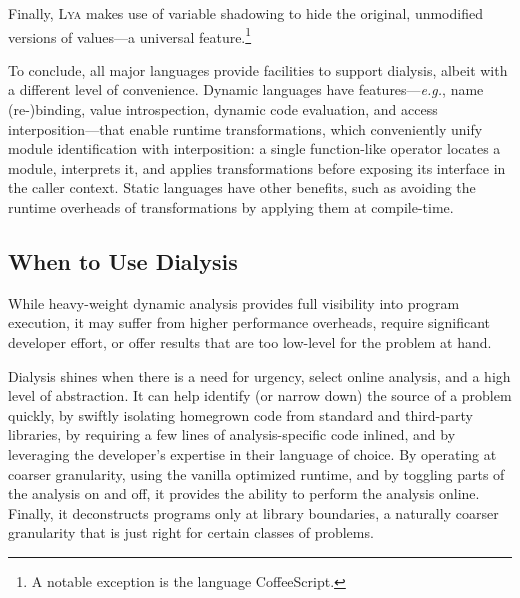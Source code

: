 \documentclass[letterpaper,twocolumn,10pt]{article}
\def\eg{{\em e.g.}, }
\def\ie{{\em i.e.}, }
\newcommand{\sys}{{\scshape Lya}\xspace}
\begin{document}
Finally, \sys makes use of variable shadowing to hide the original, unmodified versions of values---a universal feature.\footnote{
  A notable exception is the language CoffeeScript. %
}

To conclude, all major languages provide facilities to support dialysis, albeit with a different level of convenience.
Dynamic languages have features---\eg name (re-)binding, value introspection, dynamic code evaluation, and access interposition---that enable runtime transformations, which conveniently unify module identification with interposition:
  a single function-like operator locates a module, interprets it, and applies transformations before exposing its interface in the caller context.
Static languages have other benefits, such as avoiding the runtime overheads of transformations by applying them at compile-time.


\subsection{When to Use Dialysis}
\label{principles}
While heavy-weight dynamic analysis provides full visibility into program execution, it may suffer from higher performance overheads, require significant developer effort, or offer results that are too low-level for the problem at hand.

Dialysis shines when there is a need for urgency, select online analysis, and a high level of abstraction.
It can help identify (or narrow down) the source of a problem quickly, by swiftly isolating homegrown code from standard and third-party libraries, by requiring a few lines of analysis-specific code inlined, and by leveraging the developer's expertise in their language of choice.
By operating at coarser granularity, using the vanilla optimized runtime, and by toggling parts of the analysis on and off, it provides the ability to perform the analysis online.
Finally, it deconstructs programs only at library boundaries, a naturally coarser granularity that is just right for certain classes of problems.
\end{document}
